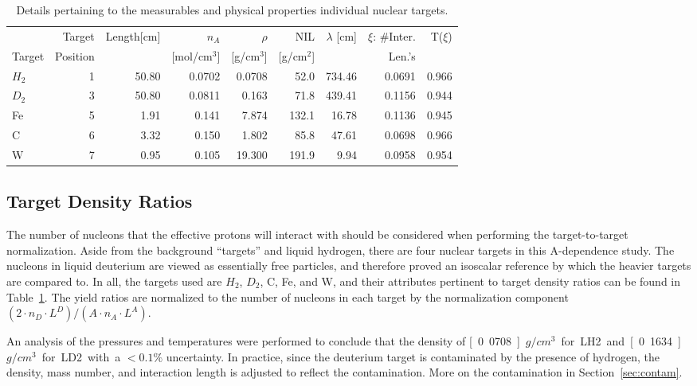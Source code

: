 \begin{table}
	\centering
	\begin{tabular}{lrrrrrrrr}
		\toprule
		{} &  Target &  Length[cm] & $n_A$  & $\rho$  &  NIL  &   $\lambda$ [cm] & $\xi$: \#Inter. & T($\xi$) \\
		Target & Position & & [mol/cm$^3$] & [g/cm$^3$] & [g/cm$^2$] & & Len.'s &  \\
		\midrule
		$H_2$ & 1 & 50.80 & 0.0702 & 0.0708 & 52.0 & 734.46 & 0.0691 & 0.966 \\ 
		$D_2$ & 3 & 50.80 & 0.0811 & 0.163 & 71.8 & 439.41 & 0.1156 & 0.944 \\
		Fe & 5 & 1.91 &	0.141 & 7.874 & 132.1 & 16.78 & 0.1136 & 0.945 \\
		C & 6 & 3.32 & 0.150 & 1.802 & 85.8 & 47.61 & 0.0698 & 0.966 \\
		W & 7 & 0.95 & 0.105 & 19.300 & 191.9 & 9.94 & 0.0958 & 0.954 \\
		\bottomrule
	\end{tabular}
	\caption{Details pertaining to the measurables and physical properties individual nuclear targets.}
	\label{tab:targ-details}
\end{table}

\subsection{Target Density Ratios}

The number of nucleons that the effective protons will interact with should be considered when performing the target-to-target normalization. Aside from the background ``targets'' and liquid hydrogen, there are four nuclear targets in this A-dependence study. The nucleons in liquid deuterium are viewed as essentially free particles, and therefore proved an isoscalar reference by which the heavier targets are compared to. In all, the targets used are $H_2$, $D_2$, C, Fe, and W, and their attributes pertinent to target density ratios can be found in Table~\ref{tab:targ-details}. The yield ratios are normalized to the number of nucleons in each target by the normalization component $(2 \cdot n_D \cdot L^D) / (A \cdot n_A \cdot L^A)$. 

An analysis of the pressures and temperatures were performed to conclude that the  density of \unit[0.0708]{$g/cm^3$} for LH2 and \unit[0.1634]{$g/cm^3$} for LD2 with a $<0.1\%$ uncertainty. In practice, since the deuterium target is contaminated by the presence of hydrogen, the density, mass number, and interaction length is adjusted to reflect the contamination. More on the contamination in Section~\ref{sec:contam}.

